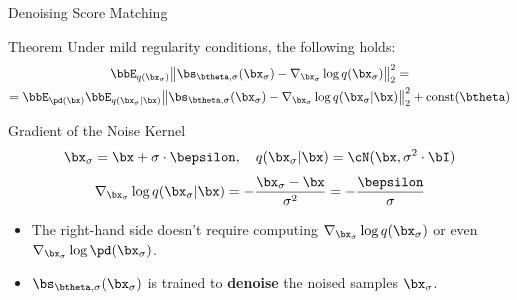 \documentclass{beamer}
\begin{document}
\begin{frame}{Denoising Score Matching}
	\begin{block}{Theorem}
		Under mild regularity conditions, the following holds:
		\vspace{-0.3cm}
		\begin{multline*}
			\bbE_{q(\bx_{\sigma})}\big\| \bs_{\btheta, \sigma}(\bx_{\sigma}) - \nabla_{\bx_{\sigma}} \log q(\bx_{\sigma}) \big\|^2_2 = \\
		= \bbE_{\pd(\bx)} \bbE_{q(\bx_{\sigma} | \bx)}\big\| \bs_{\btheta, \sigma}(\bx_{\sigma}) - \nabla_{\bx_{\sigma}} \log q(\bx_{\sigma} | \bx) \big\|^2_2 + \text{const}(\btheta)
		\end{multline*}
		\vspace{-0.5cm}
	\end{block}
	\eqpause
	\begin{block}{Gradient of the Noise Kernel}
		\vspace{-0.3cm}
		\[
			\bx_{\sigma} = \bx + \sigma \cdot \bepsilon, \quad q(\bx_{\sigma} | \bx) = \cN(\bx, \sigma^2 \cdot \bI)
		\]
		\eqpause
		\vspace{-0.3cm}
		\[
			\nabla_{\bx_{\sigma}} \log q(\bx_{\sigma} | \bx) = - \frac{\bx_{\sigma} - \bx}{\sigma^2}  = - \frac{\bepsilon}{\sigma}
		\]
		\eqpause
		\vspace{-0.5cm}
	\end{block}
	\begin{itemize}
		\item The right-hand side doesn't require computing $\nabla_{\bx_{\sigma}} \log q(\bx_{\sigma})$ or even $\nabla_{\bx_{\sigma}} \log \pd(\bx_{\sigma})$.
		\item $\bs_{\btheta, \sigma}(\bx_{\sigma})$ is trained to \textbf{denoise} the noised samples $\bx_{\sigma}$.
	\end{itemize}
\end{frame}
\end{document}
